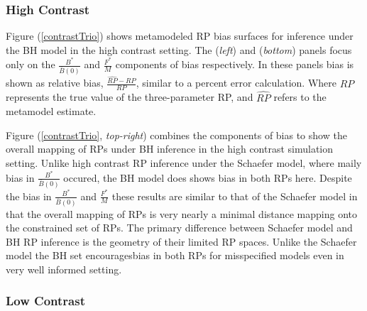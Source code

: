 \subsubsection{High Contrast}

%
Figure (\ref{contrastTrio}) shows metamodeled RP bias surfaces for inference
under the BH model in the high contrast setting. The (\emph{left}) and
(\emph{bottom}) panels focus only on the $\frac{B^*}{\bar B(0)}$ and
$\frac{F^*}{M}$ components of bias respectively. In these panels bias is shown
as relative bias, $\frac{\widehat{RP}-RP}{RP}$, similar to a percent error calculation.
Where $RP$ represents the true value of the three-parameter RP, and $\widehat{RP}$ 
refers to the metamodel estimate.

%
Figure (\ref{contrastTrio}, \emph{top-right}) combines the components of bias to
show the overall mapping of RPs under BH inference in the high contrast
simulation setting. Unlike high contrast RP inference under the Schaefer model,
where maily bias in $\frac{B^*}{\bar B(0)}$ occured, the BH model does shows
bias in both RPs here. Despite the bias in $\frac{B^*}{\bar B(0)}$ and
$\frac{F^*}{M}$ these results are similar to that of the Schaefer model in
that the overall mapping of RPs is very nearly a minimal distance mapping onto
the constrained set of RPs. %
The primary difference between Schaefer model and BH RP inference is the
geometry of their limited RP spaces. Unlike the Schaefer model the BH set
encouragesbias in both RPs for misspecified models even in very well informed
setting.

\subsubsection{Low Contrast}

